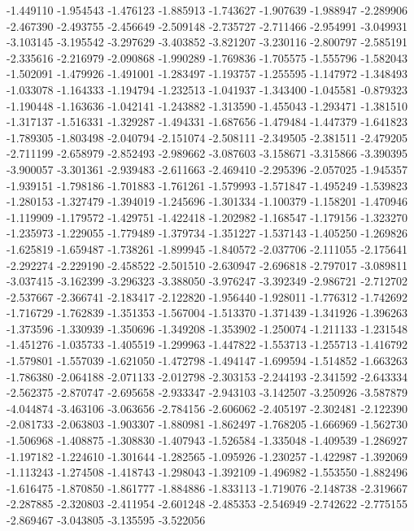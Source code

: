 -1.449110
-1.954543
-1.476123
-1.885913
-1.743627
-1.907639
-1.988947
-2.289906
-2.467390
-2.493755
-2.456649
-2.509148
-2.735727
-2.711466
-2.954991
-3.049931
-3.103145
-3.195542
-3.297629
-3.403852
-3.821207
-3.230116
-2.800797
-2.585191
-2.335616
-2.216979
-2.090868
-1.990289
-1.769836
-1.705575
-1.555796
-1.582043
-1.502091
-1.479926
-1.491001
-1.283497
-1.193757
-1.255595
-1.147972
-1.348493
-1.033078
-1.164333
-1.194794
-1.232513
-1.041937
-1.343400
-1.045581
-0.879323
-1.190448
-1.163636
-1.042141
-1.243882
-1.313590
-1.455043
-1.293471
-1.381510
-1.317137
-1.516331
-1.329287
-1.494331
-1.687656
-1.479484
-1.447379
-1.641823
-1.789305
-1.803498
-2.040794
-2.151074
-2.508111
-2.349505
-2.381511
-2.479205
-2.711199
-2.658979
-2.852493
-2.989662
-3.087603
-3.158671
-3.315866
-3.390395
-3.900057
-3.301361
-2.939483
-2.611663
-2.469410
-2.295396
-2.057025
-1.945357
-1.939151
-1.798186
-1.701883
-1.761261
-1.579993
-1.571847
-1.495249
-1.539823
-1.280153
-1.327479
-1.394019
-1.245696
-1.301334
-1.100379
-1.158201
-1.470946
-1.119909
-1.179572
-1.429751
-1.422418
-1.202982
-1.168547
-1.179156
-1.323270
-1.235973
-1.229055
-1.779489
-1.379734
-1.351227
-1.537143
-1.405250
-1.269826
-1.625819
-1.659487
-1.738261
-1.899945
-1.840572
-2.037706
-2.111055
-2.175641
-2.292274
-2.229190
-2.458522
-2.501510
-2.630947
-2.696818
-2.797017
-3.089811
-3.037415
-3.162399
-3.296323
-3.388050
-3.976247
-3.392349
-2.986721
-2.712702
-2.537667
-2.366741
-2.183417
-2.122820
-1.956440
-1.928011
-1.776312
-1.742692
-1.716729
-1.762839
-1.351353
-1.567004
-1.513370
-1.371439
-1.341926
-1.396263
-1.373596
-1.330939
-1.350696
-1.349208
-1.353902
-1.250074
-1.211133
-1.231548
-1.451276
-1.035733
-1.405519
-1.299963
-1.447822
-1.553713
-1.255713
-1.416792
-1.579801
-1.557039
-1.621050
-1.472798
-1.494147
-1.699594
-1.514852
-1.663263
-1.786380
-2.064188
-2.071133
-2.012798
-2.303153
-2.244193
-2.341592
-2.643334
-2.562375
-2.870747
-2.695658
-2.933347
-2.943103
-3.142507
-3.250926
-3.587879
-4.044874
-3.463106
-3.063656
-2.784156
-2.606062
-2.405197
-2.302481
-2.122390
-2.081733
-2.063803
-1.903307
-1.880981
-1.862497
-1.768205
-1.666969
-1.562730
-1.506968
-1.408875
-1.308830
-1.407943
-1.526584
-1.335048
-1.409539
-1.286927
-1.197182
-1.224610
-1.301644
-1.282565
-1.095926
-1.230257
-1.422987
-1.392069
-1.113243
-1.274508
-1.418743
-1.298043
-1.392109
-1.496982
-1.553550
-1.882496
-1.616475
-1.870850
-1.861777
-1.884886
-1.833113
-1.719076
-2.148738
-2.319667
-2.287885
-2.320803
-2.411954
-2.601248
-2.485353
-2.546949
-2.742622
-2.775155
-2.869467
-3.043805
-3.135595
-3.522056
